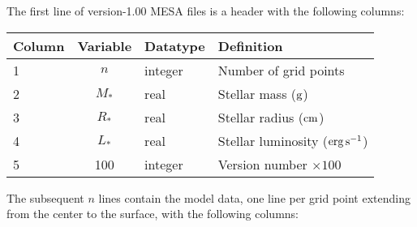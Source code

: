 \documentclass{article}
\newcommand{\Rstar}{\ensuremath{R_{\ast}}}
\newcommand{\Mstar}{\ensuremath{M_{\ast}}}
\newcommand{\Lstar}{\ensuremath{L_{\ast}}}
\newcommand{\cm}{\ensuremath{{\rm cm}}}
\newcommand{\gram}{\ensuremath{{\rm g}}}
\newcommand{\second}{\ensuremath{{\rm s}}}
\newcommand{\erg}{\ensuremath{{\rm erg}}}
\begin{document}
The first line of version-1.00 MESA files is a header with the following
columns:

\begin{table}[h!]
\begin{tabular}{|l|c|l|l|} \hline
Column & Variable & Datatype & Definition \\ \hline
1      & $n$ & integer & Number of grid points \\
2      & \Mstar & real & Stellar mass ($\gram$) \\
3      & \Rstar & real & Stellar radius ($\cm$) \\
4      & \Lstar & real & Stellar luminosity ($\erg\,\second^{-1}$) \\
5      & 100    & integer & Version number $\times 100$ \\ \hline
\end{tabular}
\end{table}

The subsequent $n$ lines contain the model data, one line per
grid point extending from the center to the surface, with the following columns:
\end{document}
